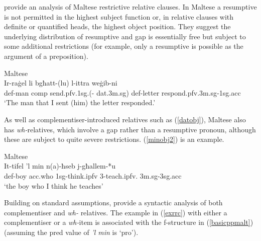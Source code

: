 \documentclass[output=paper,hidelinks]{langscibook}
\begin{document}
\ea \label{head-adjunction}  \hfill{\citep[223]{Asudeh12}}
\z





\ea  \label{asher}
 \hfill{\citep[223]{Asudeh12}  }
\z


\citet{CamSad11:LFG} provide an analysis of Maltese restrictive relative clauses.   In Maltese a resumptive is not permitted in the highest subject function or, in relative clauses with definite or quantified heads, the highest object position.  They
suggest the underlying distribution of resumptive and gap is essentially free but subject to some additional restrictions (for example, only a resumptive is possible as the argument of a preposition).

\ea \label{datobj} Maltese \citep[113]{CamSad11:LFG}\\
\gll	Ir-ra\.{g}el		li		bgħatt-(lu)		l-ittra		we\.{g}ib-ni\\
	{\sc def}-man	{\sc comp}	send.{\sc pfv}.{\sc 1sg}.(-{\sc
         dat.3m.sg})	{\sc def}-letter	respond.{\sc pfv}.{\sc 3m.sg}-{\sc 1sg.acc}\\
	\glt `The man that I sent (him) the letter responded.'
\z


As well as complementiser-introduced relatives such as (\ref{datobj}),  Maltese also has  {\em wh-}relatives, which involve a gap rather than a resumptive pronoun, although these are subject to quite severe restrictions. (\ref{minobj2}) is an example.


\ea
\label{minobj2} Maltese \citep[114]{CamSad11:LFG}\\
\gll
It-tifel		 {'l min}		n(a)-ħseb	j-għallem-*u\\
{\sc def}-boy	{\sc acc}.who	{\sc 1sg}-think.{\sc ipfv}		3-teach.{\sc ipfv}.{\sc
3m.sg}-{\sc 3sg.acc}\\
\glt `the boy  who I think he teaches'
\z






Building on standard assumptions, \citet{CamSad11:LFG} provide a syntactic analysis of both complementiser and {\em wh-} relatives.  The example in (\ref{exrrc}) with either a complementiser or a {\em wh-}item is
associated with the f-structure in (\ref{basicppmalt})  (assuming the {\sc pred}  value of {\em 'l min} is {\sc `pro'}).
\end{document}
